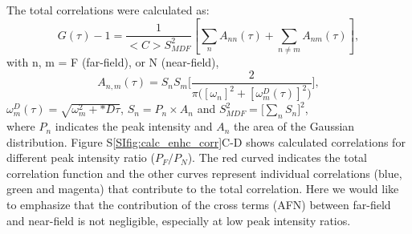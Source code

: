 \documentclass[11pt,a4paper,onecolumn]{article}
\begin{document}
The total correlations were calculated as:
\begin{equation}
	G(\tau)-1 = \frac{1}{<C>S_{MDF}^2}[\sum_{n}A_{nn}(\tau) + \sum_{n\neq m}A_{nm}(\tau)],
	\label{eq:far-near-gauss}
\end{equation}
with n, m = F (far-field), or N (near-field),
\begin{equation}
	A_{n,m}(\tau)=S_nS_m\Bigg[\frac{2}{\pi\Big([\omega_n]^2 + [\omega_m^D(\tau)]^2 \Big)}\Bigg] ,
	\label{eq:area-gauss}
\end{equation}
$\omega_m^D(\tau)=\sqrt{\omega_m^2 + *D\tau}$, $S_n=P_n\times A_n$ and $S_{MDF}^2=\Big[\sum_{n}S_n\Big]^2$,\\
where $P_n$ indicates the peak intensity and $A_n$ the area of the Gaussian distribution. 
Figure S\ref{SIfig:calc_enhc_corr}C-D shows calculated correlations for different peak intensity ratio ($P_F/P_N$). 
The red curved indicates the total correlation function and the other curves represent individual correlations (blue, green and magenta) that contribute to the total correlation.
Here we would like to emphasize that the contribution of the cross terms (AFN) between far-field and near-field is not negligible, especially at low peak intensity ratios.
\end{document}
